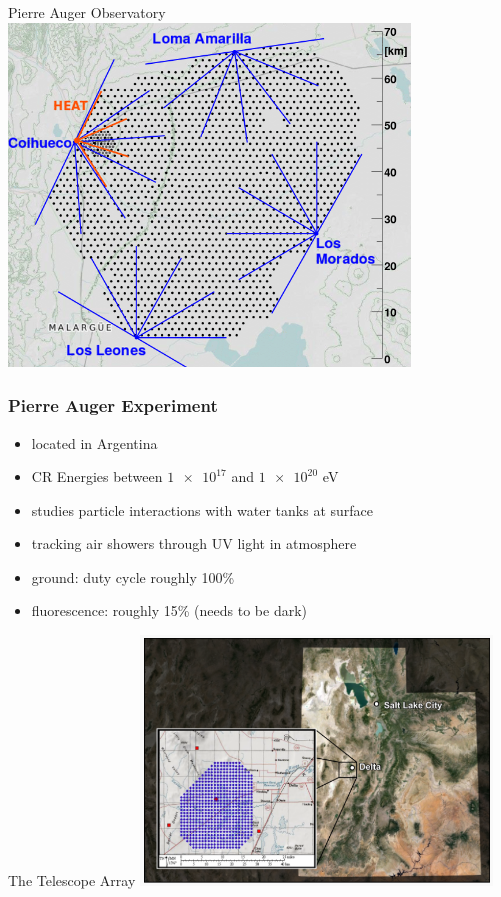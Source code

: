 \documentclass[aspectratio=1610, 9pt]{beamer}
\begin{document}
\begin{frame}{Pierre Auger Observatory}
  \includegraphics[width=0.8\textwidth]{pierre.png}
\end{frame}

\begin{frame}\frametitle{Pierre Auger Experiment}
  \begin{itemize}
    \item located in Argentina
    \item CR Energies between $\num{1e17}$ and $\num{1e20}$ eV
    \item studies particle interactions with water tanks at surface
    \item tracking air showers through UV light in atmosphere
    \item ground: duty cycle roughly 100\%
    \item fluorescence: roughly 15\% (needs to be dark)
  \end{itemize}
\end{frame}

\begin{frame}{The Telescope Array}
  \includegraphics[width=0.7\textwidth]{TCA.png}
\end{frame}
\end{document}
